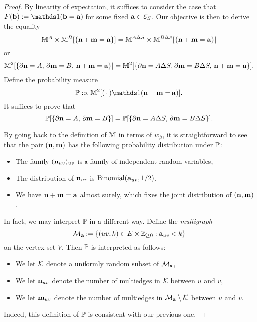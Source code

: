 \begin{proof}
    By linearity of expectation,
    it suffices to consider the case that $F(\b):=\true{\b=\a}$
    for some fixed $\a\in\calE_S$.
    Our objective is then to derive the equality
    \[
        \M^A\times \M^B[\{\n+\m=\a\}]
        =
        \M^{A\Delta S}\times \M^{B\Delta S}[\{\n+\m=\a\}]
    \]
    or
    \begin{align}
        \M^2[\{\partial\n=A,\,\partial\m=B,\,\n+\m=\a\}]
        =
        \M^2[\{\partial\n=A\Delta S,\,\partial\m=B\Delta S,\,\n+\m=\a\}].
    \end{align}
    Define the probability measure
    \[
        \P:\propto\M^2[(\blank)\true{\n+\m=\a}].
    \]
    It suffices to prove that
    \begin{equation}
        \label{eq:switching_target_equation}
    \P[\{\partial\n=A,\,\partial\m=B\}]
    =
    \P[\{\partial\n=A\Delta S,\,\partial\m=B\Delta S\}].
    \end{equation}

    By going back to the definition of $\M$ in terms of $w_\beta$,
    it is straightforward to see that the pair $(\n,\m)$ has the following probability distribution under $\P$:
    \begin{itemize}
        \item The family $(\n_{uv})_{uv}$ is a family of independent random variables,
        \item The distribution of $\n_{uv}$ is $\operatorname{Binomial}(\a_{uv},1/2)$,
        \item We have $\n+\m=\a$ almost surely, which fixes the joint distribution of $(\n,\m)$.
    \end{itemize}
    In fact, we may interpret $\P$ in a different way.
    Define the \emph{multigraph}
    \[
        \calM_\a:=\{(uv,k)\in E\times\Z_{\geq 0}:\a_{uv}<k\}
    \]
    on the vertex set $V$.
    Then $\P$ is interpreted as follows:
    \begin{itemize}
        \item We let $\calK$ denote a uniformly random subset of $\calM_\a$,
        \item We let $\n_{uv}$ denote the number of multiedges in $\calK$ between $u$ and $v$,
        \item We let $\m_{uv}$ denote the number of multiedges in $\calM_\a\setminus\calK$ between $u$ and $v$.
    \end{itemize}
    Indeed, this definition of $\P$ is consistent with our previous one.


\end{proof}
